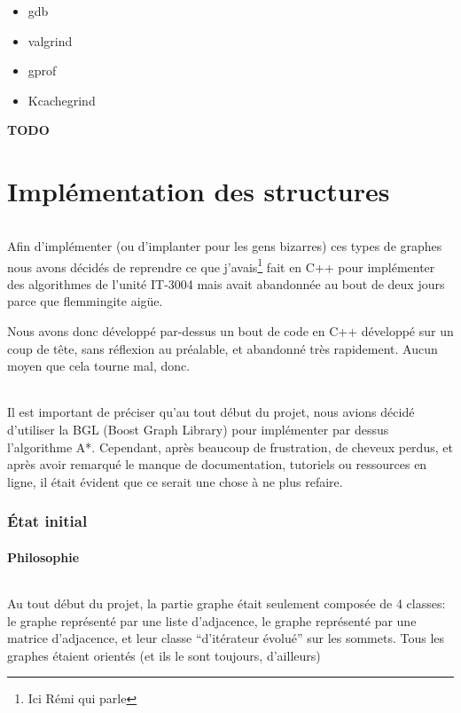 \documentclass[french]{article}
\begin{document}
\begin{itemize}
	\item gdb
	\item valgrind
	\item gprof
	\item Kcachegrind
\end{itemize}

\textbf{\Huge{TODO}}

\part{Implémentation des structures}

\paragraph{} Afin d'implémenter (ou d'implanter pour les gens bizarres) ces
types de graphes nous avons décidés de reprendre ce que j'avais\footnote{Ici
	Rémi qui parle} fait en C++ pour implémenter des algorithmes de l'unité
IT-3004 mais avait abandonnée au bout de deux jours parce que flemmingite
aigüe.

Nous avons donc développé par-dessus un bout de code en C++ développé sur un
coup de tête, sans réflexion au préalable, et abandonné très rapidement. Aucun
moyen que cela tourne mal, donc.

\paragraph{} Il est important de préciser qu'au tout début du projet, nous
avions décidé d'utiliser la BGL (Boost Graph Library) pour implémenter par
dessus l'algorithme A*. Cependant, après beaucoup de frustration, de cheveux
perdus, et après avoir remarqué le manque de documentation, tutoriels ou
ressources en ligne, il était évident que ce serait une chose à ne plus
refaire.

\section{État initial}

\subsection{Philosophie}

\paragraph{} Au tout début du projet, la partie graphe était seulement composée
de 4 classes: le graphe représenté par une liste d'adjacence, le graphe
représenté par une matrice d'adjacence, et leur classe ``d'itérateur évolué''
sur les sommets. Tous les graphes étaient orientés (et ils le sont toujours,
d'ailleurs)
\end{document}
